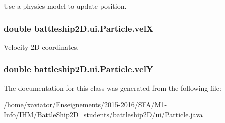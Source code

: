 Use a physics model to update position. 

\hypertarget{classbattleship2D_1_1ui_1_1Particle_a9e831b513842b2cd2e41fc1a2524e590}{
\subsubsection[{vel\-X}]{\setlength{\rightskip}{0pt plus 5cm}double battleship2\-D.\-ui.\-Particle.\-vel\-X\hspace{0.3cm}{\ttfamily [private]}}}\label{classbattleship2D_1_1ui_1_1Particle_a9e831b513842b2cd2e41fc1a2524e590}


Velocity 2\-D coordinates. 

\hypertarget{classbattleship2D_1_1ui_1_1Particle_a75fa162ccfdadf4b05828097a4e1549c}{
\subsubsection[{vel\-Y}]{\setlength{\rightskip}{0pt plus 5cm}double battleship2\-D.\-ui.\-Particle.\-vel\-Y\hspace{0.3cm}{\ttfamily [package]}}}\label{classbattleship2D_1_1ui_1_1Particle_a75fa162ccfdadf4b05828097a4e1549c}


The documentation for this class was generated from the following file\-:\begin{DoxyCompactItemize}
\item 
/home/xaviator/\-Enseignements/2015-\/2016/\-S\-F\-A/\-M1-\/\-Info/\-I\-H\-M/\-Battle\-Ship2\-D\-\_\-students/battleship2\-D/ui/\hyperlink{Particle_8java}{Particle.\-java}\end{DoxyCompactItemize}
